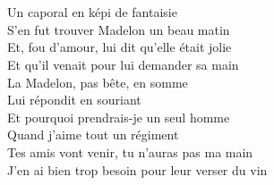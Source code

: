 \\\\Un caporal en képi de fantaisie
\\S'en fut trouver Madelon un beau matin
\\Et, fou d'amour, lui dit qu'elle était jolie
\\Et qu'il venait pour lui demander sa main
\\La Madelon, pas bête, en somme
\\Lui répondit en souriant
\\Et pourquoi prendrais-je un seul homme
\\Quand j'aime tout un régiment
\\Tes amis vont venir, tu n'auras pas ma main
\\J'en ai bien trop besoin pour leur verser du vin


\breakpage